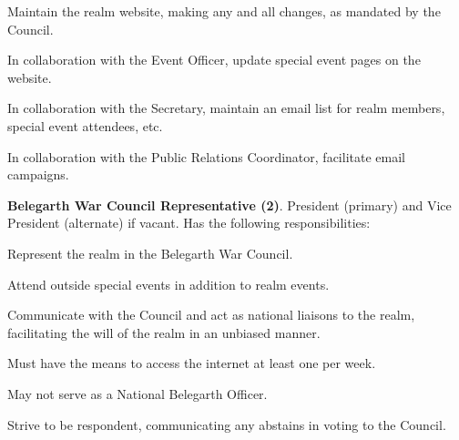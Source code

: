 \documentclass[12pt]{article}
\begin{document}
\begin{level}
\begin{level}
    \begin{level}
        \item Maintain the realm website, making any and all changes, as mandated by the Council.
        \item In collaboration with the Event Officer, update special event pages on the website.
        \item In collaboration with the Secretary, maintain an email list for realm members, special event attendees, etc.
        \item In collaboration with the Public Relations Coordinator, facilitate email campaigns.
        \item {}
    \end{level}
    \item \textbf{Belegarth War Council Representative (2)}. President (primary) and Vice President (alternate) if vacant. Has the following responsibilities:
    \begin{level}
        \item Represent the realm in the Belegarth War Council.
        \item Attend outside special events in addition to realm events.
        \item Communicate with the Council and act as national liaisons to the realm, facilitating the will of the realm in an unbiased manner.
        \item Must have the means to access the internet at least one per week.
        \item May not serve as a National Belegarth Officer.
        \item Strive to be respondent, communicating any abstains in voting to the Council.
    \end{level}
\end{level}

\end{level}
\end{document}
